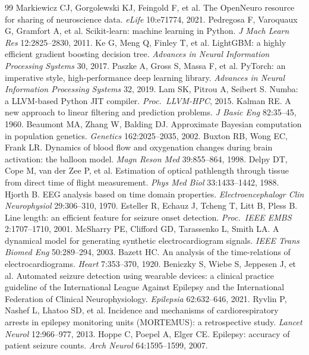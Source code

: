 \begin{thebibliography}{99}
 Markiewicz CJ, Gorgolewski KJ, Feingold F, et al. The OpenNeuro resource for sharing of neuroscience data. \emph{eLife} 10:e71774, 2021.
 Pedregosa F, Varoquaux G, Gramfort A, et al. Scikit-learn: machine learning in Python. \emph{J Mach Learn Res} 12:2825--2830, 2011.
 Ke G, Meng Q, Finley T, et al. LightGBM: a highly efficient gradient boosting decision tree. \emph{Advances in Neural Information Processing Systems} 30, 2017.
 Paszke A, Gross S, Massa F, et al. PyTorch: an imperative style, high-performance deep learning library. \emph{Advances in Neural Information Processing Systems} 32, 2019.
 Lam SK, Pitrou A, Seibert S. Numba: a LLVM-based Python JIT compiler. \emph{Proc.\ LLVM-HPC}, 2015.
 Kalman RE. A new approach to linear filtering and prediction problems. \emph{J Basic Eng} 82:35--45, 1960.
 Beaumont MA, Zhang W, Balding DJ. Approximate Bayesian computation in population genetics. \emph{Genetics} 162:2025--2035, 2002.
 Buxton RB, Wong EC, Frank LR. Dynamics of blood flow and oxygenation changes during brain activation: the balloon model. \emph{Magn Reson Med} 39:855--864, 1998.
 Delpy DT, Cope M, van der Zee P, et al. Estimation of optical pathlength through tissue from direct time of flight measurement. \emph{Phys Med Biol} 33:1433--1442, 1988.
 Hjorth B. EEG analysis based on time domain properties. \emph{Electroencephalogr Clin Neurophysiol} 29:306--310, 1970.
 Esteller R, Echauz J, Tcheng T, Litt B, Pless B. Line length: an efficient feature for seizure onset detection. \emph{Proc.\ IEEE EMBS} 2:1707--1710, 2001.
 McSharry PE, Clifford GD, Tarassenko L, Smith LA. A dynamical model for generating synthetic electrocardiogram signals. \emph{IEEE Trans Biomed Eng} 50:289--294, 2003.
 Bazett HC. An analysis of the time-relations of electrocardiograms. \emph{Heart} 7:353--370, 1920.
 Beniczky S, Wiebe S, Jeppesen J, et al. Automated seizure detection using wearable devices: a clinical practice guideline of the International League Against Epilepsy and the International Federation of Clinical Neurophysiology. \emph{Epilepsia} 62:632--646, 2021.
 Ryvlin P, Nashef L, Lhatoo SD, et al. Incidence and mechanisms of cardiorespiratory arrests in epilepsy monitoring units (MORTEMUS): a retrospective study. \emph{Lancet Neurol} 12:966--977, 2013.
 Hoppe C, Poepel A, Elger CE. Epilepsy: accuracy of patient seizure counts. \emph{Arch Neurol} 64:1595--1599, 2007.

\end{thebibliography}
